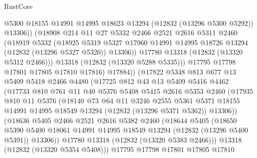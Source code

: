 \begin{lexlean}{RustCore}
\begin{coremodule}
                  @5300
                  @18155
                  @14991
                  @14995
                  @18623
                  @13294
                  (@12832 (@13296 @5300 @5292))
                  @13306))
              (@18908
                @214
                @11
                @27
                @5332
                @2466
                @2521
                @2616
                @5311
                @2460
                (@18919
                  @5332
                  (@18925
                    @5319
                    @5327
                    @17960
                    @14991
                    @14995
                    @18726
                    @13294
                    (@12832 (@13296 @5327 @5320))
                    @13306))
                @17780
                @13318
                (@12832 (@13320 @5312 @2466)))
              @13318
              (@12832 (@13320 @5288 @5335)))
            @17795
            @17798
            @17801
            @17805
            @17810
            @17816)
          @17884))
      (@17822
        @5348
        @813
        @677
        @13
        @5409
        @5418
        @2466
        @4480
        (@17725
          @812
          @43
          @13
          @5409
          @5416
          @4462
          (@17733
            @810
            @761
            @11
            @40
            @5376
            @5408
            @5415
            @2616
            @5353
            @2460
            (@17935
              @810
              @11
              @5376
              (@18140
                @73
                @64
                @11
                @3246
                @2555
                @5361
                @5371
                @18155
                @14991
                @14995
                @18549
                @13294
                (@12832 (@13296 @5371 @5362))
                @13306))
            (@18636
              @5405
              @2466
              @2521
              @2616
              @5382
              @2460
              (@18644
                @5405
                (@18650
                  @5390
                  @5400
                  @18061
                  @14991
                  @14995
                  @18549
                  @13294
                  (@12832 (@13296 @5400 @5391))
                  @13306))
              @17780
              @13318
              (@12832 (@13320 @5383 @2466)))
            @13318
            (@12832 (@13320 @5354 @5408)))
          @17795
          @17798
          @17801
          @17805
          @17810

\end{coremodule}
\end{lexlean}
